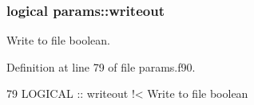 \subsubsection[{\texorpdfstring{writeout}{writeout}}]{\setlength{\rightskip}{0pt plus 5cm}logical params\+::writeout}\hypertarget{namespaceparams_affc7b423a975c0e92b62e67ed04edea5}{}\label{namespaceparams_affc7b423a975c0e92b62e67ed04edea5}


Write to file boolean. 



Definition at line 79 of file params.\+f90.


\begin{DoxyCode}
79   \textcolor{keywordtype}{LOGICAL} :: writeout\textcolor{comment}{       !< Write to file boolean}
\end{DoxyCode}
